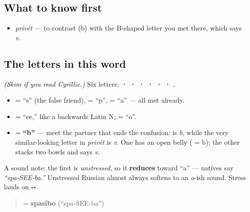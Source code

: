 \subsection*{What to know first}
\begin{itemize}
\raggedright
  \item \emph{privét} — to contrast \textbf{} (b) with the B-shaped letter you met there, which says \emph{v}.
\end{itemize}

\subsection*{The letters in this word}
\emph{(Skim if you read Cyrillic.)} Six letters: \textbf{ ·  ·  ·  ·  ·  · }.

\begin{itemize}
\raggedright
  \item \textbf{} = \textquotedblleft{}s\textquotedblright{} (the false friend), \textbf{} = \textquotedblleft{}p\textquotedblright{}, \textbf{} = \textquotedblleft{}a\textquotedblright{} — all met already.
  \item \textbf{} = \textquotedblleft{}ee,\textquotedblright{} like a backwards Latin N; \textbf{} = \textquotedblleft{}o\textquotedblright{}.
  \item \textbf{} = \textbf{\textquotedblleft{}b\textquotedblright{}} — meet the partner that ends the confusion: \textbf{} is \emph{b}, while the very similar-looking letter in \emph{privét} is \emph{v}. One has an open belly ( = b); the other stacks two bowls and says \emph{v}.
\end{itemize}

A sound note: the first \textbf{} is \emph{unstressed}, so it \textbf{reduces} toward \textquotedblleft{}a\textquotedblright{} — natives say \emph{\textquotedblleft{}spa-SEE-ba.\textquotedblright{}} Unstressed Russian \emph{} almost always softens to an \emph{a}-ish sound. Stress lands on \textbf{--}.

\begin{quote}
\textbf{} = \textbf{spasíbo} (\textquotedblleft{}spa-SEE-ba\textquotedblright{})
\end{quote}

